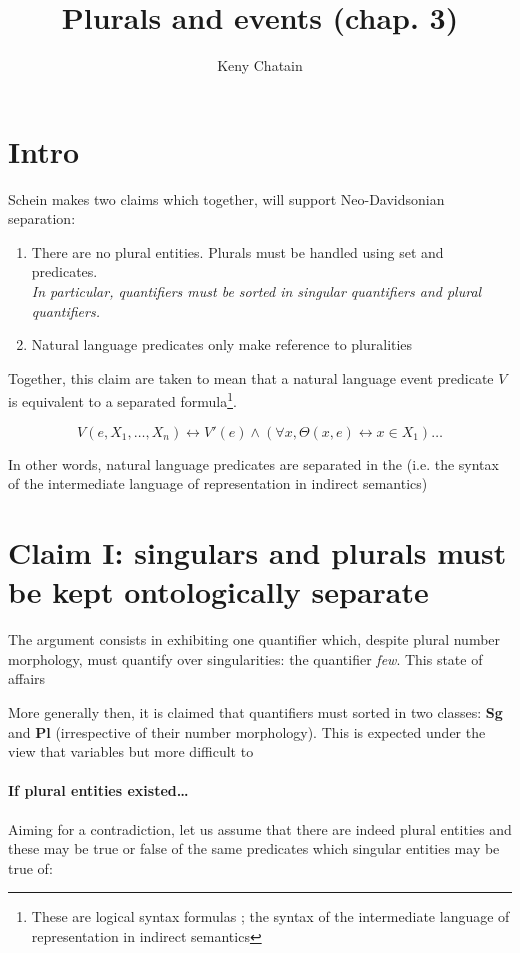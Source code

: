 \documentclass[english]{article}
\title{Plurals and events (chap. 3)}
\author{Keny Chatain}
\begin{document}
\maketitle

\section*{Intro}
Schein makes two claims which together, will support Neo-Davidsonian separation:

\begin{enumerate}
\item There are no plural entities. Plurals must be handled using set and predicates.\\
\emph{In particular, quantifiers must be sorted in singular quantifiers and plural quantifiers.}
\item Natural language predicates only make reference to pluralities
\end{enumerate}
%
Together, this claim are taken to mean that a natural language event predicate $V$ is equivalent to a separated formula\footnote{These are logical syntax formulas ; the syntax of the intermediate language of representation in indirect semantics}. 

$$V(e, X_1, \ldots, X_n) \leftrightarrow V'(e) \wedge \left( \forall x, \Theta(x, e) \leftrightarrow x\in X_1\right) \ldots $$

In other words, natural language predicates are separated in the  (i.e. the syntax of the intermediate language of representation in indirect semantics)

\section*{Claim I: singulars and plurals must be kept ontologically separate}

The argument consists in exhibiting one quantifier which, despite plural number morphology, must quantify over singularities: the quantifier \emph{few}. This state of affairs

More generally then, it is claimed that quantifiers must sorted in two classes: \textbf{Sg} and \textbf{Pl} (irrespective of their number morphology). This is expected under the view that variables but more difficult to 

\paragraph{If plural entities existed\ldots}
%
Aiming for a contradiction, let us assume that there are indeed plural entities and these may be true or false of the same predicates which singular entities may be true of:
\end{document}
